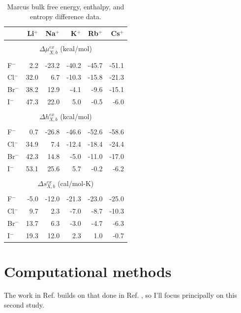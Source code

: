 \begin{cpa}
  \begin{table}
   \begin{center}
    \begin{tabular}{lrrrrr}
     \hline
     \hline
      & Li$^+$ & Na$^+$ & K$^+$ & Rb$^+$ & Cs$^+$ \\
     \hline
     \\
     \multicolumn{6}{c}{$\Delta\mu^{ex}_{X,b}$  (kcal/mol)} \\
     \\
      F$^-$ & 2.2 & -23.2 & -40.2 & -45.7 & -51.1 \\
      Cl$^-$ & 32.0 & 6.7 & -10.3 & -15.8 & -21.3 \\
      Br$^-$ & 38.2 & 12.9 & -4.1 & -9.6 & -15.1 \\
      I$^-$ & 47.3 & 22.0 & 5.0 & -0.5 & -6.0 \\
     \\
     \multicolumn{6}{c}{$\Delta h^{ex}_{X,b}$  (kcal/mol)} \\
     \\
      F$^-$ & 0.7 & -26.8 & -46.6 & -52.6 & -58.6 \\
      Cl$^-$ & 34.9 & 7.4 & -12.4 & -18.4 & -24.4 \\
      Br$^-$ & 42.3 & 14.8 & -5.0 & -11.0 & -17.0 \\
      I$^-$ & 53.1 & 25.6 & 5.7 & -0.2 & -6.2 \\
     \\
     \multicolumn{6}{c}{$\Delta s^{ex}_{X,b}$ (cal/mol-K)} \\
     \\
      F$^-$ & -5.0 & -12.0 & -21.3 & -23.0 & -25.0 \\
      Cl$^-$ & 9.7 & 2.3 & -7.0 & -8.7 & -10.3 \\
      Br$^-$ & 13.7 & 6.3 & -3.0 & -4.7 & -6.3 \\
      I$^-$ & 19.3 & 12.0 & 2.3 & 1.0 & -0.7 \\
     \hline
     \hline
    \end{tabular}
   \end{center}
   \caption[Ion pair differences in the bulk thermodynamic quantities]{Marcus bulk free energy, enthalpy, and entropy difference data.\cite{marcus1985book}}
   \label{tab:marcus}
  \end{table}

  \section{\label{ch5:sec2:level1}Computational methods}
  The work in Ref. \cite{pollard2014cpa2} builds on that done in Ref. \cite{pollard2014cpa1}, so I'll focus principally on this second study.
  

\end{cpa}

